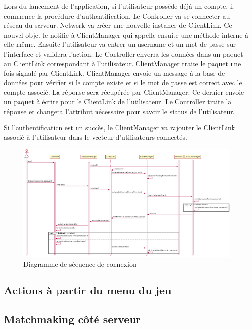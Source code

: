 \documentclass{article}
\begin{document}
Lors du lancement de l'application, si l'utilisateur possède déjà un compte, il commence la procédure d'authentification. Le Controller va se connecter au réseau du serveur. Network va créer une nouvelle instance de ClientLink. Ce nouvel objet le notifie à ClientManager qui appelle ensuite une méthode interne à elle-même. Ensuite l'utilisateur va entrer un username et un mot de passe sur l'interface et validera l'action. Le Controller enverra les données dans un paquet au ClientLink correspondant à l'utilisateur. ClientManager traite le paquet une fois signalé par ClientLink. ClientManager envoie un message à la base de données pour vérifier si le compte existe et si le mot de passe est correct avec le compte associé. La réponse sera récupérée par ClientManager. Ce dernier envoie un paquet à écrire pour le ClientLink de l'utilisateur. Le Controller traite la réponse et changera l'attribut nécessaire pour savoir le status de l'utilisateur.

Si l'authentification est un succès, le ClientManager va rajouter le ClientLink associé à l'utilisateur dans le vecteur d'utilisateurs connectés.

\begin{figure}[H]
    \centering
    \includegraphics[width=1\textwidth]{../res/uml/sequence/ConnexionSequence.png}
    \caption{Diagramme de séquence de connexion}
    \label{fig:ConnexionSeqDiagram}
\end{figure}

\subsection{Actions à partir du menu du jeu}

\subsection{Matchmaking côté serveur}
\end{document}
